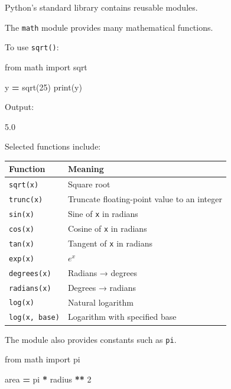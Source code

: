 \documentclass[
]{article}
\newenvironment{Shaded}{\begin{snugshade}}{\end{snugshade}}
\newcommand{\BuiltInTok}[1]{#1}
\newcommand{\DecValTok}[1]{\textcolor[rgb]{0.00,0.00,0.81}{#1}}
\newcommand{\ImportTok}[1]{#1}
\newcommand{\NormalTok}[1]{#1}
\newcommand{\OperatorTok}[1]{\textcolor[rgb]{0.81,0.36,0.00}{\textbf{#1}}}
\newcounter{none} %
\begin{document}
Python's standard library contains reusable modules.

The \texttt{math} module provides many mathematical functions.

To use \texttt{sqrt()}:

\begin{Shaded}
\begin{Highlighting}[]
\ImportTok{from}\NormalTok{ math }\ImportTok{import}\NormalTok{ sqrt}

\NormalTok{y }\OperatorTok{=}\NormalTok{ sqrt(}\DecValTok{25}\NormalTok{)}
\BuiltInTok{print}\NormalTok{(y)}
\end{Highlighting}
\end{Shaded}

Output:

\begin{Shaded}
\begin{Highlighting}[]
\NormalTok{5.0}
\end{Highlighting}
\end{Shaded}

Selected functions include:

{\def\LTcaptype{none} %
\begin{longtable}[]{@{}ll@{}}
\toprule\noalign{}
Function & Meaning \\
\midrule\noalign{}
\endhead
\bottomrule\noalign{}
\endlastfoot
\texttt{sqrt(x)} & Square root \\
\texttt{trunc(x)} & Truncate floating-point value to an integer \\
\texttt{sin(x)} & Sine of \texttt{x} in radians \\
\texttt{cos(x)} & Cosine of \texttt{x} in radians \\
\texttt{tan(x)} & Tangent of \texttt{x} in radians \\
\texttt{exp(x)} & \(e^x\) \\
\texttt{degrees(x)} & Radians → degrees \\
\texttt{radians(x)} & Degrees → radians \\
\texttt{log(x)} & Natural logarithm \\
\texttt{log(x,\ base)} & Logarithm with specified base \\
\end{longtable}
}

The module also provides constants such as \texttt{pi}.

\begin{Shaded}
\begin{Highlighting}[]
\ImportTok{from}\NormalTok{ math }\ImportTok{import}\NormalTok{ pi}

\NormalTok{area }\OperatorTok{=}\NormalTok{ pi }\OperatorTok{*}\NormalTok{ radius }\OperatorTok{**} \DecValTok{2}
\end{Highlighting}
\end{Shaded}
\end{document}
